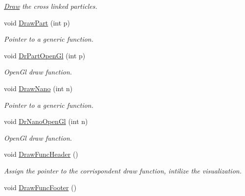 \begin{DoxyCompactItemize}
\begin{DoxyCompactList}\small\item\em \hyperlink{classDraw}{\-Draw} the cross linked particles. \end{DoxyCompactList}\item 
\hypertarget{classElPoly_aefa30992af110f1b0e1b60ee028b9f38}{void \hyperlink{classElPoly_aefa30992af110f1b0e1b60ee028b9f38}{\-Draw\-Part} (int p)}\label{classElPoly_aefa30992af110f1b0e1b60ee028b9f38}

\begin{DoxyCompactList}\small\item\em \-Pointer to a generic function. \end{DoxyCompactList}\item 
\hypertarget{classElPoly_a65249b90a9125f72098eee0fde2a2155}{void \hyperlink{classElPoly_a65249b90a9125f72098eee0fde2a2155}{\-Dr\-Part\-Open\-Gl} (int p)}\label{classElPoly_a65249b90a9125f72098eee0fde2a2155}

\begin{DoxyCompactList}\small\item\em \-Open\-Gl draw function. \end{DoxyCompactList}\item 
\hypertarget{classElPoly_a15254dc837a01412ec79ec26e9019095}{void \hyperlink{classElPoly_a15254dc837a01412ec79ec26e9019095}{\-Draw\-Nano} (int n)}\label{classElPoly_a15254dc837a01412ec79ec26e9019095}

\begin{DoxyCompactList}\small\item\em \-Pointer to a generic function. \end{DoxyCompactList}\item 
\hypertarget{classElPoly_a7bfac52311cca966565486c45b0b2097}{void \hyperlink{classElPoly_a7bfac52311cca966565486c45b0b2097}{\-Dr\-Nano\-Open\-Gl} (int n)}\label{classElPoly_a7bfac52311cca966565486c45b0b2097}

\begin{DoxyCompactList}\small\item\em \-Open\-Gl draw function. \end{DoxyCompactList}\item 
\hypertarget{classElPoly_a878c5cd187a779112e98485c1fd4fa7a}{void \hyperlink{classElPoly_a878c5cd187a779112e98485c1fd4fa7a}{\-Draw\-Func\-Header} ()}\label{classElPoly_a878c5cd187a779112e98485c1fd4fa7a}

\begin{DoxyCompactList}\small\item\em \-Assign the pointer to the corrispondent draw function, intilize the visualization. \end{DoxyCompactList}\item 
\hypertarget{classElPoly_ae201022731c9c081b2c8575bb4d80929}{void \hyperlink{classElPoly_ae201022731c9c081b2c8575bb4d80929}{\-Draw\-Func\-Footer} ()}\label{classElPoly_ae201022731c9c081b2c8575bb4d80929}


\end{DoxyCompactItemize}
